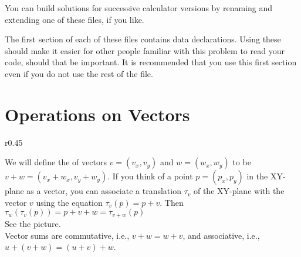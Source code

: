 \documentclass[12pt]{article}
\begin{document}
You can build solutions for successive calculator versions
by renaming and extending one of these files, if you like.

The first section of each of these files contains data declarations.
Using these should make it easier
for other people familiar with this problem to read your
code, should that be important.
It is recommended that you use this first section even
if you do not use the rest of the file.
 


\section{Operations on Vectors}
\begin{minipage}{\textwidth}\raggedright
\begin{wrapfigure}{r}{0.45\textwidth}
\end{wrapfigure}
We will define the  of vectors $v=(v_x,v_y)$ and
$w=(w_x,w_y)$ to be $v+w=(v_x+w_x,v_y+w_y)$.  If you
think of a point $p=(p_x,p_y)$ in the XY-plane as a vector,
you can associate a translation $\tau_v$ of the XY-plane
with the vector $v$ using the equation $\tau_v(p)=p+v$.  Then\\
\hspace*{0.2in}$\tau_w(\tau_v(p)) = p+v+w = \tau_{v+w}(p)$ \\
See the picture.
\\[1ex]
Vector sums are commutative, i.e.,  $v+w=w+v$, and associative,
i.e., $u+(v+w)=(u+v)+w$.
\end{minipage}
\end{document}
